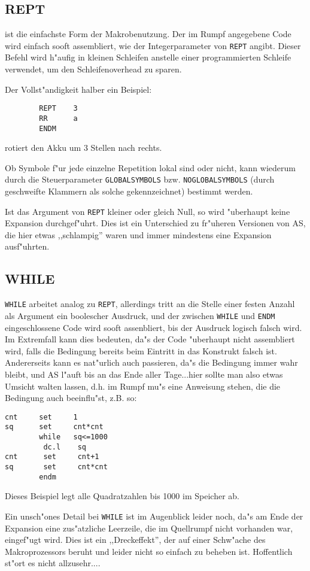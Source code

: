 \documentclass[12pt,a4paper,twoside]{report}
\makeatletter
\newcommand{\tty}[1]{{\tt #1}}
\newcommand{\ttindex}[1]{\index{#1@{\tt #1}}}
\makeatother
\begin{document}
{%

\subsection{REPT}
\ttindex{REPT}

ist die einfachste Form der Makrobenutzung.  Der im Rumpf angegebene
Code wird einfach sooft assembliert, wie der Integerparameter von
\tty{REPT} angibt.  Dieser Befehl wird h"aufig in kleinen Schleifen anstelle
einer programmierten Schleife verwendet, um den Schleifenoverhead zu
sparen.
\par
Der Vollst"andigkeit halber ein Beispiel:
\begin{verbatim}
        REPT    3
        RR      a
        ENDM
\end{verbatim}
rotiert den Akku um 3 Stellen nach rechts.
\par
Ob Symbole f"ur jede einzelne Repetition lokal sind oder nicht,
kann wiederum durch die Steuerparameter \tty{GLOBALSYMBOLS} bzw.
\tty{NOGLOBALSYMBOLS} (durch geschweifte Klammern als solche
gekennzeichnet) bestimmt werden.

Ist das Argument von \tty{REPT} kleiner oder gleich Null, so wird
"uberhaupt keine Expansion durchgef"uhrt.  Dies ist ein Unterschied
zu fr"uheren Versionen von AS, die hier etwas ,,schlampig'' waren
und immer mindestens eine Expansion ausf"uhrten.


\subsection{WHILE}
\ttindex{WHILE}

\tty{WHILE} arbeitet analog zu \tty{REPT}, allerdings tritt an die
Stelle einer festen Anzahl als Argument ein boolescher Ausdruck, und
der zwischen \tty{WHILE} und \tty{ENDM} eingeschlossene Code wird sooft
assenbliert, bis der Ausdruck logisch falsch wird.  Im Extremfall kann
dies bedeuten, da"s der Code "uberhaupt nicht assembliert wird, falls die
Bedingung bereits beim Eintritt in das Konstrukt falsch ist.  Andererseits
kann es nat"urlich auch passieren, da"s die Bedingung immer wahr bleibt,
und AS l"auft bis an das Ende aller Tage...hier sollte man also etwas
Umsicht walten lassen, d.h. im Rumpf mu"s eine Anweisung stehen, die die
Bedingung auch beeinflu"st, z.B. so:
\begin{verbatim}
cnt     set     1
sq      set     cnt*cnt
        while   sq<=1000
         dc.l    sq
cnt      set     cnt+1
sq       set     cnt*cnt
        endm
\end{verbatim}
Dieses Beispiel legt alle Quadratzahlen bis 1000 im Speicher ab.
\par
Ein unsch"ones Detail bei \tty{WHILE} ist im Augenblick leider noch,
da"s am Ende der Expansion eine zus"atzliche Leerzeile, die im Quellrumpf
nicht vorhanden war, eingef"ugt wird.  Dies ist ein ,,Dreckeffekt'',
der auf einer Schw"ache des Makroprozessors beruht und leider nicht so
einfach zu beheben ist.  Hoffentlich st"ort es nicht allzusehr....

}
\end{document}
